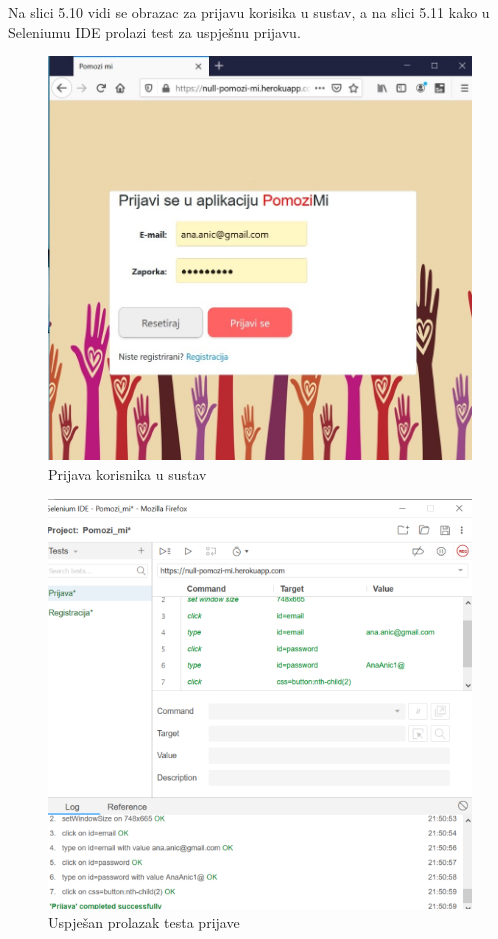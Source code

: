         \noindent \text 
        Na slici 5.10 vidi se obrazac za prijavu korisika u sustav, a na slici 5.11 kako u Seleniumu IDE prolazi test za uspješnu prijavu.\\
		\begin{figure}[H]
                 \includegraphics[width=\textwidth, height=\textheight, keepaspectratio]{slike/prijavaObrazac.jpg}
                \centering
                \caption{Prijava korisnika u sustav}
        \end{figure}
		\begin{figure}[H]
                 \includegraphics[width=\textwidth, height=\textheight, keepaspectratio]{slike/prijava.png}
                \centering
                \caption{Uspješan prolazak testa prijave}
        \end{figure}
